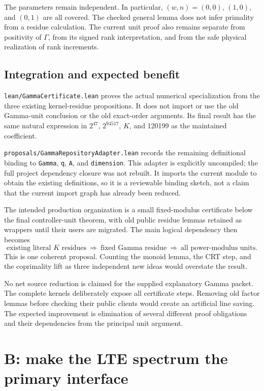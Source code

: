 \documentclass[11pt]{article}
\newcommand{\code}[1]{\nolinkurl{#1}}
\begin{document}
The parameters remain independent. In particular, \((w,n)=(0,0)\),
\((1,0)\), and \((0,1)\) are all covered. The checked general lemma does not
infer primality from a residue calculation. The current unit proof also remains
separate from positivity of \(\Gamma\), from its signed rank interpretation,
and from the safe physical realization of rank increments.

\subsection{Integration and expected benefit}
\code{lean/GammaCertificate.lean} proves the actual numerical specialization
from the three existing kernel-residue propositions. It does not import or use
the old Gamma-unit conclusion or the old exact-order arguments. Its final result
has the same natural expression in \(2^{47}\), \(2^{94517}\), \(K\), and
120199 as the maintained coefficient.

\code{proposals/GammaRepositoryAdapter.lean} records the remaining definitional
binding to \code{Gamma}, \code{q}, \code{A}, and \code{dimension}. This adapter
is explicitly uncompiled; the full project dependency closure was not rebuilt.
It imports the current module to obtain the existing definitions, so it is a
reviewable binding sketch, not a claim that the current import graph has already
been reduced.

The intended production organization is a small fixed-modulus certificate below
the final controller-unit theorem, with old public residue lemmas retained as
wrappers until their users are migrated. The main logical dependency then becomes
\[
 \text{existing literal }K\text{ residues}
 \ \Longrightarrow\ \text{fixed Gamma residue}
 \ \Longrightarrow\ \text{all power-modulus units}.
\]
This is one coherent proposal. Counting the monoid lemma, the CRT step, and the
coprimality lift as three independent new ideas would overstate the result.

No net source reduction is claimed for the supplied explanatory Gamma packet.
The complete kernels deliberately expose all certificate steps. Removing old
factor lemmas before checking their public clients would create an artificial
line saving. The expected improvement is elimination of several different
proof obligations and their dependencies from the principal unit argument.

\section{B: make the LTE spectrum the primary interface}
\end{document}
